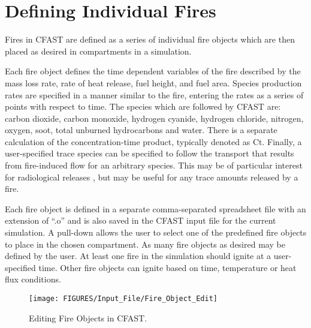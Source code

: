 \section{Defining Individual Fires}

Fires in CFAST are defined as a series of individual fire objects which are then placed as desired in compartments in a simulation.

Each fire object defines the time dependent variables of the fire described by the mass loss rate, rate of heat release, fuel height, and fuel area.  Species production rates are specified in a manner similar to the fire, entering the rates as a series of points with respect to time.  The species which are followed by CFAST are: carbon dioxide, carbon monoxide, hydrogen cyanide, hydrogen chloride, nitrogen, oxygen, soot, total unburned hydrocarbons and water. There is a separate calculation of the concentration-time product, typically denoted as Ct. Finally, a user-specified trace species can be specified to follow the transport that results from fire-induced flow for an arbitrary species. This may be of particular interest for radiological releases \cite{Jones:2008}, but may be useful for any trace amounts released by a fire.

Each fire object is defined in a separate comma-separated spreadsheet file with an extension of ``.o'' and is also saved in the CFAST input file for the current simulation. A pull-down allows the user to select one of the predefined fire objects to place in the chosen compartment. As many fire objects as desired may be defined by the user.  At least one fire in the simulation should ignite at a user-specified time.  Other fire objects can ignite based on time, temperature or heat flux conditions.

\begin{figure}[h!]
\begin{center}
\texttt{[image: FIGURES/Input\_File/Fire\_Object\_Edit]}
\caption[Editing Fire Objects in CFAST]{Editing Fire Objects in CFAST.}
\end{center}
\end{figure}

